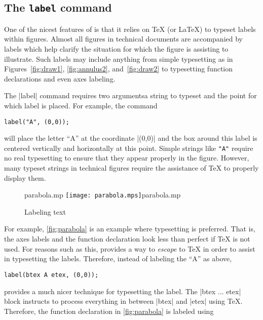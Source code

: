 \subsection{The \texttt{label} command}

One of the nicest features of \MP{} is that it relies on \TeX{} (or
\LaTeX) to typeset labels within figures.  Almost all figures in
technical documents are accompanied by labels which help clarify the
situation for which the figure is assisting to illustrate.  Such labels
may include anything from simple typesetting as in
Figures~\ref{fig:draw1}, \ref{fig:annulus2}, and~\ref{fig:draw2} to
typesetting function declarations and even axes labeling.

The |label| command requires two arguments\Dash a string to typeset and
the point for which label is placed.  For example, the command

\begin{lstlisting}[style=MP]
label("A", (0,0));
\end{lstlisting}
will place the letter ``A'' at the coordinate |(0,0)| and the box around
this label is centered vertically and horizontally at this point.
Simple strings like \lstinline[style=text]{"A"} require no real
typesetting to ensure that they appear properly in the figure.  However,
many typeset strings in technical figures require the assistance of
\TeX{} to properly display them.

\begin{figure}
  \begin{withattachment}{parabola.mp}
    \centering
    \texttt{[image: parabola.mps]}{parabola.mp}
  \end{withattachment}
  \caption{Labeling text}
  \label{fig:parabola}
\end{figure}

For example, \autoref{fig:parabola} is an example where typesetting is
preferred.  That is, the axes labels and the function declaration look
less than perfect if \TeX{} is not used.  For reasons such as this,
\MP{} provides a way to \textit{escape} to \TeX{} in order to assist in
typesetting the labels.  Therefore, instead of labeling the ``A'' as
above,

\begin{lstlisting}[style=MP]
label(btex A etex, (0,0));
\end{lstlisting}
provides a much nicer technique for typesetting the label.  The
|btex ... etex| block instructs \MP{} to process everything in between
|btex| and |etex| using \TeX.  Therefore, the function declaration in
\autoref{fig:parabola} is labeled using

